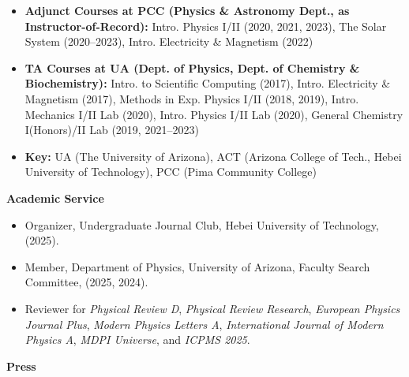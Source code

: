 \documentclass[11pt]{article}
\begin{document}
\begin{itemize}[leftmargin=*,nosep]
    \item \textbf{Adjunct Courses at PCC (Physics \& Astronomy Dept., as Instructor-of-Record):} Intro. Physics I/II (2020, 2021, 2023), The Solar System (2020--2023), Intro. Electricity \& Magnetism (2022)
    \item \textbf{TA Courses at UA (Dept. of Physics, Dept. of Chemistry \& Biochemistry):} Intro. to Scientific Computing (2017), Intro. Electricity \& Magnetism (2017), Methods in Exp. Physics I/II (2018, 2019), Intro. Mechanics I/II Lab (2020), Intro. Physics I/II Lab (2020), General Chemistry I(Honors)/II Lab (2019, 2021--2023)
    \item \textbf{Key:} UA (The University of Arizona), ACT (Arizona College of Tech., Hebei University of Technology), PCC (Pima Community College)
\end{itemize}

\medskip

{\Large\textbf{Academic Service}}

\begin{itemize}[leftmargin=*,nosep]
    \item Organizer, Undergraduate Journal Club, Hebei University of Technology, (2025).
    \item Member, Department of Physics, University of Arizona, Faculty Search Committee, (2025, 2024).
    \item Reviewer for \textit{Physical Review D}, \textit{Physical Review Research}, \textit{European Physics Journal Plus}, \textit{Modern Physics Letters A}, \textit{International Journal of Modern Physics A}, \textit{MDPI Universe}, and \textit{ICPMS 2025}.
\end{itemize}

\newpage

{\Large\textbf{Press}}
\end{document}
